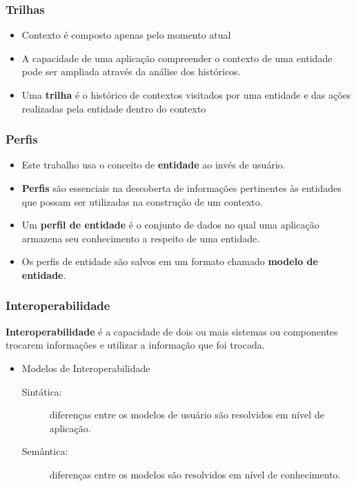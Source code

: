 \documentclass[14pt]{beamer}
\begin{document}

\begin{frame}
  \frametitle{Trilhas}
  \begin{itemize}
    \item Contexto é composto apenas pelo momento atual
    \item A capacidade de uma aplicação compreender o contexto de uma entidade pode ser ampliada através da análise dos históricos.
    \item Uma \textbf{trilha} é o histórico de contextos visitados por uma entidade e das ações realizadas pela entidade dentro do contexto
  \end{itemize}
\end{frame}
    

\begin{frame}
  \frametitle{Perfis}
    \begin{itemize}
      \item Este trabalho usa o conceito de \textbf{entidade} ao invés de usuário.
      \item \textbf{Perfis} são essenciais na descoberta de informações pertinentes às entidades que possam ser utilizadas na construção de um contexto.
      \item Um \textbf{perfil de entidade} é o conjunto de dados no qual uma aplicação armazena seu conhecimento a respeito de uma entidade. 
      \item Os perfis de entidade são salvos em um formato chamado \textbf{modelo de entidade}.
    \end{itemize}
\end{frame}
    

\begin{frame}
  \frametitle{Interoperabilidade}
  \textbf{Interoperabilidade} é a capacidade de dois ou mais sistemas ou componentes trocarem informações e utilizar a informação que foi trocada.
  \begin{itemize}
    \item Modelos de Interoperabilidade
    \begin{description}
      \item[Sintática:] diferenças entre os modelos de usuário são resolvidos em nível de aplicação.
      \item[Semântica:] diferenças entre os modelos são resolvidos em nível de conhecimento.
    \end{description}
  \end{itemize}
\end{frame}
    
\end{document}
